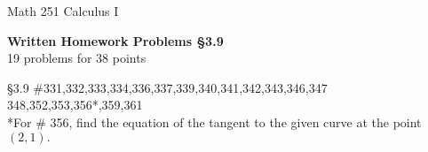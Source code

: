 \documentclass[11pt]{report}
\theoremstyle{plain}
\begin{document}
\hfill Math 251 Calculus I
\begin{center}
\Large{\textbf{Written Homework Problems \S 3.9}} \\
19 problems for 38 points\\
\end{center}

\begin{description}
\item{\S 3.9} \#331,332,333,334,336,337,339,340,341,342,343,346,347 348,352,353,356*,359,361\\

*For \# 356, find the equation of the tangent to the given curve at the point $(2,1).$


\end{description}
\end{document}
